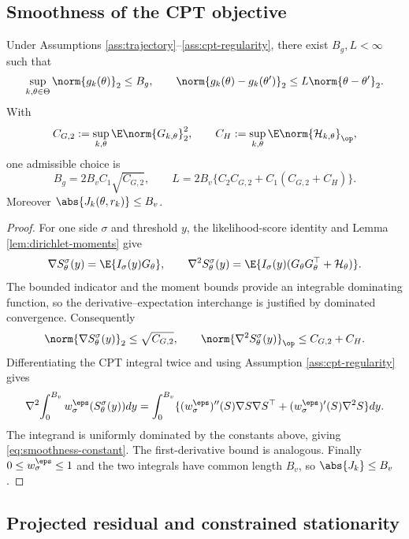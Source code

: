 \subsection{Smoothness of the CPT objective}

\begin{lemma}\label{lem:cpt-smoothness}
Under Assumptions \ref{ass:trajectory}--\ref{ass:cpt-regularity}, there exist $B_g,L<\infty$ such that
\begin{equation}\label{eq:uniform-gradient-smoothness}
 \sup_{k,\theta\in\Theta}\norm{g_k(\theta)}_2\le B_g,
 \qquad
 \norm{g_k(\theta)-g_k(\theta')}_2\le L\norm{\theta-\theta'}_2.
\end{equation}
With
\[
 C_{G,2}:=\sup_{k,\theta}\E\norm{G_{k,\theta}}_2^2,
 \qquad
 C_H:=\sup_{k,\theta}\E\norm{\mathcal H_{k,\theta}}_{\op},
\]
one admissible choice is
\begin{equation}\label{eq:smoothness-constant}
 B_g=2B_vC_1\sqrt{C_{G,2}},
 \qquad
 L=2B_v\{C_2C_{G,2}+C_1(C_{G,2}+C_H)\}.
\end{equation}
Moreover $\abs{J_k(\theta,r_k)}\le B_v$.
\end{lemma}

\begin{proof}
For one side $\sigma$ and threshold $y$, the likelihood-score identity and Lemma \ref{lem:dirichlet-moments} give
\[
 \nabla S_\theta^\sigma(y)=\E\{I_\sigma(y)G_\theta\},
 \qquad
 \nabla^2S_\theta^\sigma(y)
 =\E\{I_\sigma(y)(G_\theta G_\theta^\top+\mathcal H_\theta)\}.
\]
The bounded indicator and the moment bounds provide an integrable dominating function, so the derivative--expectation interchange is justified by dominated convergence.  Consequently
\[
 \norm{\nabla S_\theta^\sigma(y)}_2\le\sqrt{C_{G,2}},
 \qquad
 \norm{\nabla^2S_\theta^\sigma(y)}_{\op}\le C_{G,2}+C_H.
\]
Differentiating the CPT integral twice and using Assumption \ref{ass:cpt-regularity} gives
\[
 \nabla^2\!\int_0^{B_v}w_\sigma^\eps(S_\theta^\sigma(y))dy
 =\int_0^{B_v}
 \{(w_\sigma^\eps)''(S)\nabla S\nabla S^\top
 +(w_\sigma^\eps)'(S)\nabla^2S\}dy.
\]
The integrand is uniformly dominated by the constants above, giving \eqref{eq:smoothness-constant}.  The first-derivative bound is analogous.  Finally $0\le w_\sigma^\eps\le1$ and the two integrals have common length $B_v$, so $\abs{J_k}\le B_v$.
\end{proof}

\subsection{Projected residual and constrained stationarity}

